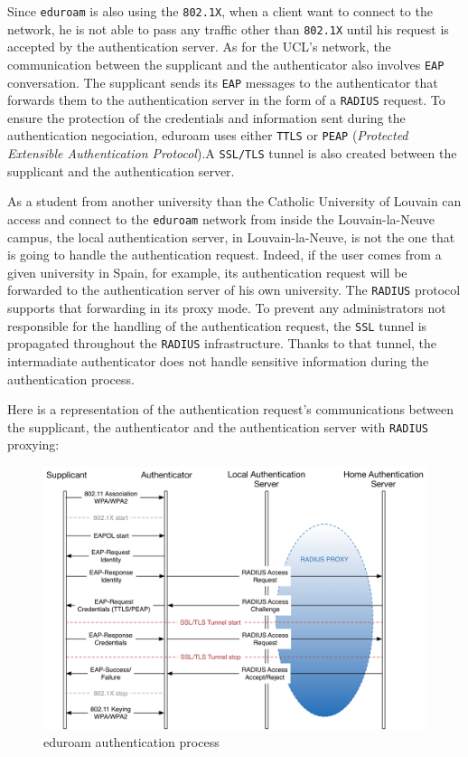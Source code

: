 Since \texttt{eduroam} is also using the \texttt{802.1X}, when a client want to connect to the network, he is not able to pass any traffic other than \texttt{802.1X} until his request is accepted by the authentication server. As for the UCL's network, the communication between the supplicant and the authenticator also involves \texttt{EAP} conversation. The supplicant sends its \texttt{EAP} messages to the authenticator that forwards them to the authentication server in the form of a \texttt{RADIUS} request. To ensure the protection of the credentials and information sent during the authentication negociation, eduroam uses either \texttt{TTLS} or \texttt{PEAP} (\textit{Protected Extensible Authentication Protocol}).A \texttt{SSL/TLS} tunnel is also created between the supplicant and the authentication server.

As a student from another university than the Catholic University of Louvain can access and connect to the \texttt{eduroam} network from inside the Louvain-la-Neuve campus, the local authentication server, in Louvain-la-Neuve, is not the one that is going to handle the authentication request. Indeed, if the user comes from a given university in Spain, for example, its authentication request will be forwarded to the authentication server of his own university. The \texttt{RADIUS} protocol supports that forwarding in its proxy mode. To prevent any administrators not responsible for the handling of the authentication request, the \texttt{SSL} tunnel is propagated throughout the \texttt{RADIUS} infrastructure. Thanks to that tunnel, the intermadiate authenticator does not handle sensitive information during the authentication process.

Here is a representation of the authentication request's communications between the supplicant, the authenticator and the authentication server with \texttt{RADIUS} proxying:
\begin{figure}[H]
	\includegraphics[width=1\linewidth]{Pictures/Chapter2/eduroam1.png}
	\caption{eduroam authentication process}
\end{figure}


